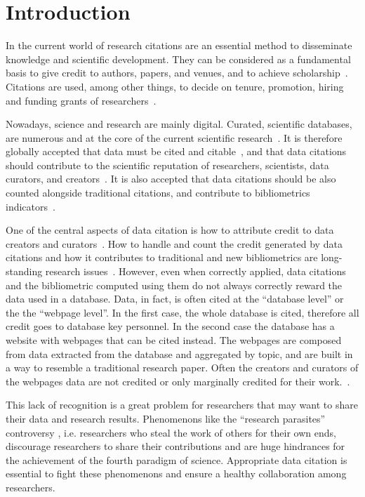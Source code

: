 
\section{Introduction}

In the current world of research citations are an essential method to disseminate knowledge and scientific development. 
They can be considered as a fundamental basis to give credit to authors, papers, and venues, and to achieve scholarship~\citep{ZouP16}. Citations are used, among other things, to decide on tenure, promotion, hiring and funding grants of researchers~\citep{meho2007impact, Cronin01, Hartley17, Kosten16}.

Nowadays, science and research are mainly digital. Curated, scientific databases, are numerous and at the core of the current scientific research~\citep{bunemann2016citation}.
It is therefore globally accepted that data must be cited and citable~\citep{LawrenceEtAl2011,CallaghanDPTCKABBLLMHSWW12}, and that data citations should contribute to the scientific reputation of researchers, scientists, data curators, and creators~\citep{AltmanEtAl2015,Spengler2012}.
It is also accepted that data citations should be also counted alongside traditional citations, and contribute to bibliometrics indicators~\citep{Belter2014,Peters2016}.

One of the central aspects of data citation is how to attribute credit to data creators and curators~\citep{buneman2019summ}. 
How to handle and count the credit generated by data citations and how it contributes to traditional and new bibliometrics are long-standing research issues~\citep{garfield1999journal,Borgman2016}.
However, even when correctly applied, data citations and the bibliometric computed using them do not always correctly reward the data used in a database.
Data, in fact, is often cited at the ``database level'' or the the ``webpage level''. 
In the first case, the whole database is cited, therefore all credit goes to database key personnel.
In the second case the database has a website with webpages that can be cited instead. 
The webpages are composed from data extracted from the database and aggregated by topic, and are built in a way to resemble a traditional research paper.
Often the creators and curators of the webpages data are not credited or only marginally credited for their work.~\citep{AlawiniDSTW17}.

This lack of recognition is a great problem for researchers that may want to share their data and research results. Phenomenons like the ``research parasites'' controversy \citep{longo2016data}, i.e. researchers who steal the work of others for their own ends, discourage researchers to share their contributions and are huge hindrances for the achievement of the fourth paradigm of science.
Appropriate data citation is essential to fight these phenomenons and ensure a healthy collaboration among researchers.

